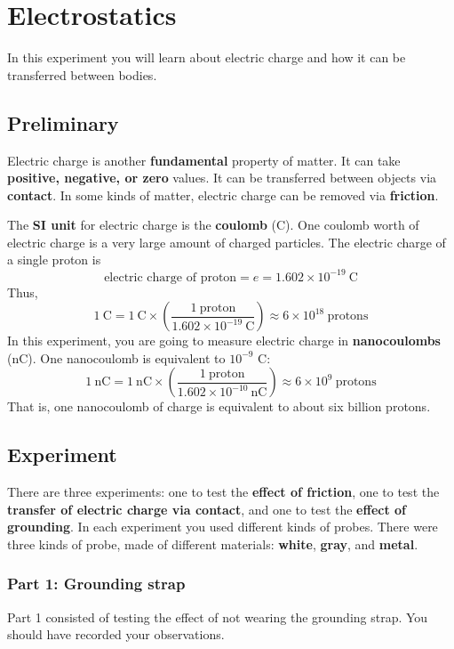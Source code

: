 \setcounter{chapter}{0}
\chapter{Electrostatics}
%
In this experiment you will learn about electric charge and how it can be transferred between bodies.
%
\section{Preliminary}
%
Electric charge is another \textbf{fundamental} property of matter. It can take \textbf{positive, negative, or zero} values. It can be transferred between objects via \textbf{contact}. In some kinds of matter, electric charge can be removed via \textbf{friction}.

The \textbf{SI unit} for electric charge is the \textbf{coulomb} (C). One coulomb worth of electric charge is a very large amount of charged particles. The electric charge of a single proton is
\begin{equation}
	\text{electric charge of proton} = e = 1.602 \times 10^{-19} \ \text{C}
\end{equation}
Thus,
\begin{equation}
	1 \ \text{C} = 1 \ \text{C} \times \left(\frac{1 \ \text{proton}}{1.602 \times 10^{-19} \ \text{C}}\right) \approx 6 \times 10^{18} \ \text{protons}
\end{equation}
In this experiment, you are going to measure electric charge in \textbf{nanocoulombs} (nC). One nanocoulomb is equivalent to $10^{-9}$ C:
\begin{equation}
	1 \ \text{nC} = 1 \ \text{nC} \times \left(\frac{1 \ \text{proton}}{1.602 \times 10^{-10} \ \text{nC}}\right) \approx 6 \times 10^{9} \ \text{protons}
\end{equation}
That is, one nanocoulomb of charge is equivalent to about six billion protons.
%
\section{Experiment}
%
There are three experiments: one to test the \textbf{effect of friction}, one to test the \textbf{transfer of electric charge via contact}, and one to test the \textbf{effect of grounding}. In each experiment you used different kinds of probes. There were three kinds of probe, made of different materials: \textbf{white}, \textbf{gray}, and \textbf{metal}.
%
\subsection{Part 1: Grounding strap}
%
Part 1 consisted of testing the effect of not wearing the grounding strap. You should have recorded your observations.
%
